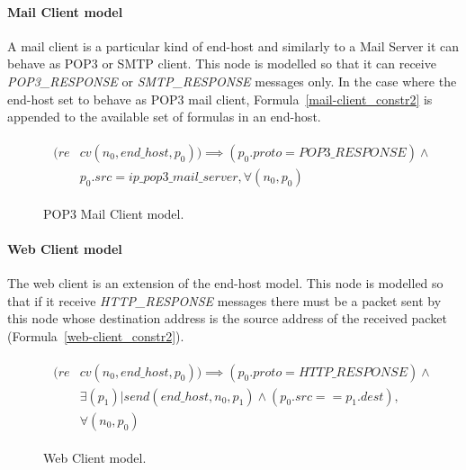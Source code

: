 \paragraph{Mail Client model} A mail client is a particular kind of end-host and similarly to a Mail Server it can behave as POP3 or SMTP client. This node is modelled so that it can receive \textit{POP3\_RESPONSE} or \textit{SMTP\_RESPONSE} messages only. In the case where the end-host set to behave as POP3 mail client, Formula~\ref{mail-client_constr2} is appended to the available set of formulas in an end-host.  
\begin{figure}[h]
	{\footnotesize
		\begin{subequations}
			\begin{align}
				\begin{split}
					\label{mail-client_constr2}
					(re& cv(n_{0},end\_host, p_{0})) \implies (p_{0}.proto = POP3\_RESPONSE) \wedge  \\
					& p_{0}.src=ip\_pop3\_mail\_server , \forall (n_{0}, p_{0})
				\end{split}
			\end{align}
		\end{subequations}
	}%
	\caption{POP3 Mail Client model.}
	\label{mail-client_model}
\end{figure}

\paragraph{Web Client model} The web client is an extension of the end-host model. This node is modelled so that if it receive \textit{HTTP\_RESPONSE} messages there must be a packet sent by this node whose destination address is the source address of the received packet (Formula~\ref{web-client_constr2}). 
\begin{figure}[h]
	{\footnotesize
		\begin{subequations}
			\begin{align}
				\begin{split}
					\label{web-client_constr2}
					(re& cv(n_{0}, end\_host, p_{0})) \implies  (p_{0}.proto = HTTP\_RESPONSE) \wedge \\
					& \exists (p_{1}) | send( end\_host, n_{0}, p_{1}) \wedge  (p_{0}.src == p_{1}.dest),\\
					& \forall (n_{0}, p_{0})
				\end{split}
			\end{align}
		\end{subequations}
	}%
	\caption{Web Client model.}
	\label{web-client_model}
\end{figure}

